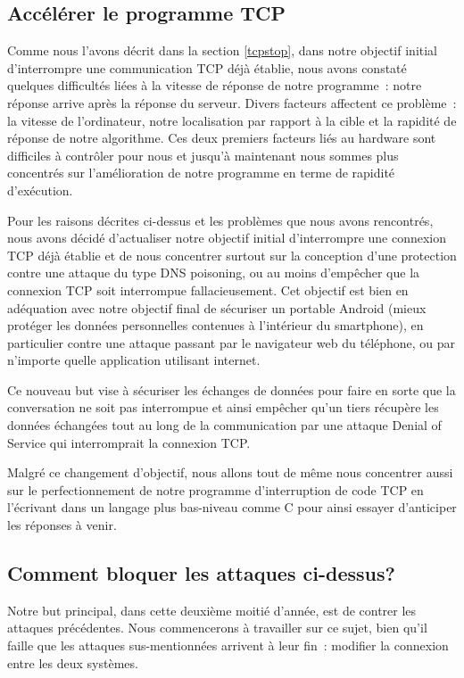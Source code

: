 \documentclass[a4paper, 12pt,twoside]{article}
\begin{document}
    \subsection{Accélérer le programme TCP}%

    Comme nous l'avons décrit dans la section \ref{tcpstop}, dans notre objectif initial d'interrompre une communication TCP déjà établie, nous avons constaté quelques difficultés liées à la vitesse de réponse de notre programme~: notre réponse arrive après la réponse du serveur. Divers facteurs affectent ce problème~: la vitesse de l'ordinateur, notre localisation par rapport à la cible et la rapidité de réponse de notre algorithme. Ces deux premiers facteurs liés au hardware sont difficiles à contrôler pour nous et jusqu'à maintenant nous sommes plus concentrés sur l'amélioration de notre programme en terme de rapidité d'exécution.

    Pour les raisons décrites ci-dessus et les problèmes que nous avons rencontrés, nous avons décidé d'actualiser notre objectif initial d'interrompre une connexion TCP déjà établie et de nous concentrer surtout sur la conception d'une protection contre une attaque du type DNS poisoning, ou au moins d'empêcher que la connexion TCP soit interrompue fallacieusement. Cet objectif est bien en adéquation avec notre objectif final de sécuriser un portable Android (mieux protéger les données personnelles contenues à l'intérieur du smartphone), en particulier contre une attaque passant par le navigateur web du téléphone, ou par n'importe quelle application utilisant internet.

    Ce nouveau but vise à sécuriser les échanges de données pour faire en sorte que la conversation ne soit pas interrompue et ainsi empêcher qu'un tiers récupère les données échangées tout au long de la communication par une attaque Denial of Service qui interromprait la connexion TCP.

    Malgré ce changement d'objectif, nous allons tout de même nous concentrer aussi sur le perfectionnement de notre programme d'interruption de code TCP en l'écrivant dans un langage plus bas-niveau comme C pour ainsi essayer d'anticiper les réponses à venir.
    
    \subsection{Comment bloquer les attaques ci-dessus?}

    Notre but principal, dans cette deuxième moitié d'année, est de contrer les attaques précédentes. Nous commencerons à travailler sur ce sujet, bien qu'il faille que les attaques sus-mentionnées arrivent à leur fin~: modifier la connexion entre les deux systèmes.
\end{document}
